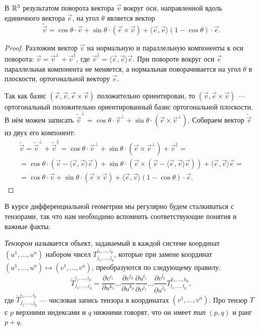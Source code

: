 \begin{lemma}
	В $\mathbb{R}^3$ результатом поворота вектора $\vec{v}$ вокруг оси, направленной вдоль единичного вектора $\vec{e}$, на угол $\theta$ является вектор
	\begin{equation} \label{eq:RodrigaR3}
		\widetilde{\vec{v}} = \cos\theta \cdot \vec{v} + \sin\theta \cdot (\vec{e} \times \vec{v}) + \langle\vec{e}, \vec{v}\rangle(1 - \cos\theta) \cdot \vec{e}.
	\end{equation}
\end{lemma}

\begin{proof}
	Разложим вектор $\vec{v}$ на нормальную и параллельную компоненты к оси поворота: $\vec{v} = \vec{v}^\perp + \vec{v}^\parallel$, где $\vec{v}^\parallel = \langle\vec{e}, \vec{v}\rangle\vec{e}$. При повороте вокруг оси $\vec{e}$ параллельная компонента не меняется, а нормальная поворачивается на угол $\theta$ в плоскости, ортогональной вектору $\vec{e}$.

	Так как базис $(\vec{e}, \vec{v}, \vec{e} \times \vec{v})$ положительно ориентирован, то $(\vec{v}, \vec{e} \times \vec{v})$ --- ортогональный положительно ориентированный базис ортогональной плоскости. В нём можем записать $\widetilde{\vec{v}}^\perp = \cos\theta \cdot \vec{v}^\perp + \sin\theta \cdot (\vec{e} \times \vec{v}^\perp)$. Собираем вектор $\widetilde{\vec{v}}$ из двух его компонент:
	\begin{multline*}
		\widetilde{\vec{v}} = \widetilde{\vec{v}}^\perp + \widetilde{\vec{v}}^\parallel = \cos\theta \cdot \vec{v}^\perp + \sin\theta \cdot (\vec{e} \times \vec{v}^\perp) + \vec{v}^\parallel =\\ = \cos\theta \cdot (\vec{v} - \langle\vec{e}, \vec{v}\rangle\vec{e}) + \sin\theta \cdot (\vec{e} \times (\vec{v} - \langle\vec{e}, \vec{v}\rangle\vec{e})) + \langle\vec{e}, \vec{v}\rangle\vec{e} =\\ = \cos\theta \cdot \vec{v} + \sin\theta \cdot (\vec{e} \times \vec{v}) + \langle\vec{e}, \vec{v}\rangle(1 - \cos\theta) \cdot \vec{e}.
	\end{multline*}
\end{proof}

В курсе дифференциальной геометрии мы регулярно будем сталкиваться с тензорами, так что нам необходимо вспомнить соответствующие понятия и важные факты.

\begin{definition}
	\textit{Тензором} называется объект, задаваемый в каждой системе координат $(u^1, \ldots, u^n)$ набором чисел $T^{i_1, \ldots, i_p}_{j_1, \ldots, j_q}$, которые при замене координат $(u^1, \ldots, u^n) \mapsto (v^1, \ldots, v^n)$, преобразуются по следующему правилу:
	\[
		\widetilde{T}^{i_1, \ldots, i_p}_{j_1, \ldots, j_q} = \frac{\partial v^{i_1}}{\partial u^{k_1}} \ldots \frac{\partial v^{i_p}}{\partial u^{k_p}}\frac{\partial u^{l_1}}{\partial v^{j_1}} \ldots \frac{\partial v^{l_q}}{\partial u^{j_q}}T^{k_1, \ldots, k_p}_{l_1, \ldots, l_q},
	\]
	где $\widetilde{T}^{i_1, \ldots, i_p}_{j_1, \ldots, j_q}$ --- числовая запись тензора в координатах $(v^1, \ldots, v^n)$. Про тензор $T$ с $p$ верхними индексами и $q$ нижними говорят, что он имеет \textit{тип} $(p, q)$ и ранг $p + q$.
\end{definition}

